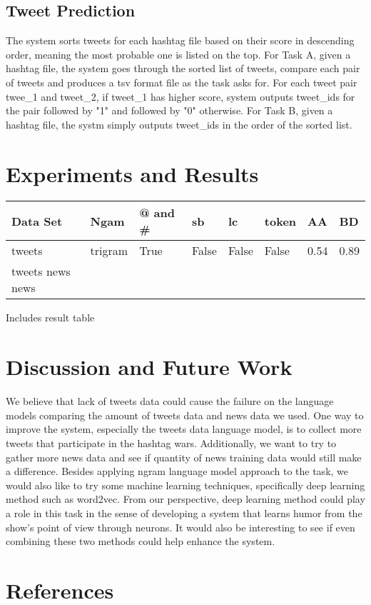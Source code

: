 \documentclass[11pt,a4paper]{article}
\begin{document}
\subsection{Tweet Prediction}
The system sorts tweets for each hashtag file based on their score in descending order, meaning the most probable one is listed on the top. For Task A, given a hashtag file, the system goes through the sorted list of tweets, compare each pair of tweets and produces a tsv format file as the task asks for. For each tweet pair twee\_1 and tweet\_2, if tweet\_1 has higher score, system outputs tweet\_ids for the pair followed by "1" and followed by "0" otherwise. For Task B, given a hashtag file, the systm simply outputs tweet\_ids in the order of the sorted list. 
\section{Experiments and Results}
\begin{tabular}{ |p{0.8cm}|p{1cm}|p{0.7cm}|p{0.7cm}|p{0.7cm}|p{0.7cm}|p{0.7cm}|p{0.7cm}|}
\hline
Data Set & Ngam & @ and \# & sb & lc & token & AA & BD \\
\hline
tweets & trigram & True & False & False & False & 0.54 & 0.89 \\
\hline
tweets
\hline
news
\hline
news
\hline
\end{tabular}
Includes result table
\section{Discussion and Future Work}
We believe that lack of tweets data could cause the failure on the language models comparing the amount of tweets data and news data we used. One way to improve the system, especially the tweets data language model, is to collect more tweets that participate in the hashtag wars. Additionally, we want to try to gather more news data and see if quantity of news training data would still make a difference. Besides applying ngram language model approach to the task, we would also like to try some machine learning techniques, specifically deep learning method such as word2vec. From our perspective, deep learning method could play a role in this task in the sense of developing a system that learns humor from the show's point of view through neurons. It would also be interesting to see if even combining these two methods could help enhance the system.
\section{References} 
\end{document}
